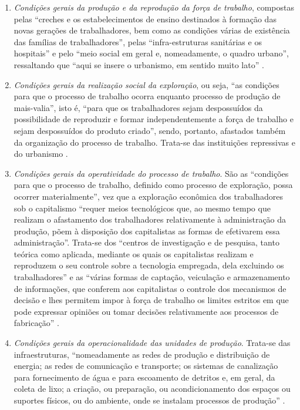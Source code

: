\begin{enumerate}
\item \textit{Condições gerais da produção e da reprodução da força de trabalho}, compostas pelas ``creches e os estabelecimentos de ensino destinados à formação das novas gerações de trabalhadores, bem como as condições várias de existência das famílias de trabalhadores'', pelas ``infra-estruturas sanitárias e os hospitais'' e pelo ``meio social em geral e, nomeadamente, o quadro urbano'', ressaltando que ``aqui se insere o urbanismo, em sentido muito lato''  \cite[p.~159]{BERNARDO1991}.
\item \textit{Condições gerais da realização social da exploração}, ou seja, ``as condições para que o processo de trabalho ocorra enquanto processo de produção de mais-valia'', isto é, ``para que os trabalhadores sejam despossuídos da possibilidade de reproduzir e formar independentemente a força de trabalho e sejam despossuídos do produto criado'', sendo, portanto, afastados também da organização do processo de trabalho. Trata-se das instituições repressivas e do urbanismo \cite[p.~159]{BERNARDO1991}.
\item \textit{Condições gerais da operatividade do processo de trabalho}. São as ``condições para que o processo de trabalho, definido como processo de exploração, possa ocorrer materialmente'', vez que a exploração econômica dos trabalhadores sob o capitalismo ``requer meios tecnológicos que, ao mesmo tempo que realizam o afastamento dos trabalhadores relativamente à administração da produção, põem à disposição dos capitalistas as formas de efetivarem essa administração''. Trata-se dos ``centros de investigação e de pesquisa, tanto teórica como aplicada, mediante os quais os capitalistas realizam e reproduzem o seu controle sobre a tecnologia empregada, dela excluindo os trabalhadores'' e as ``várias formas de captação, veiculação e armazenamento de informações, que conferem aos capitalistas o controle dos mecanismos de decisão e lhes permitem impor à força de trabalho os limites estritos em que pode expressar opiniões ou tomar decisões relativamente aos processos de fabricação'' \cite[p.~160]{BERNARDO1991}.
\item \textit{Condições gerais da operacionalidade das unidades de produção}. Trata-se das infraestruturas, ``nomeadamente as redes de produção e distribuição de energia; as redes de comunicação e transporte; os sistemas de canalização para fornecimento de água e para escoamento de detritos e, em geral, da coleta de lixo; a criação, ou preparação, ou acondicionamento dos espaços ou suportes físicos, ou do ambiente, onde se instalam processos de produção'' \cite[p.~160-161]{BERNARDO1991}.

\end{enumerate}
